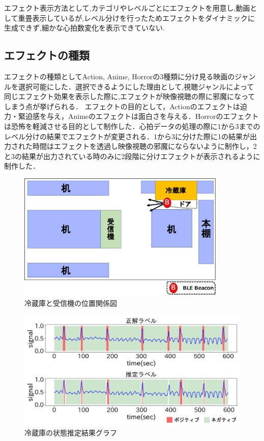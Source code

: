 エフェクト表示方法として,カテゴリやレベルごとにエフェクトを用意し,動画として重畳表示しているが,レベル分けを行ったためエフェクトをダイナミックに生成できず,細かな心拍数変化を表示できていない.


\subsection{エフェクトの種類}

エフェクトの種類としてAction, Anime, Horrorの3種類に分け見る映画のジャンルを選択可能にした．選択できるようにした理由として,視聴ジャンルによって同じエフェクト効果を表示した際に,エフェクトが映像視聴の際に邪魔になってしまう点が挙げられる．
エフェクトの目的として，Actionのエフェクトは迫力・緊迫感を与え，Animeのエフェクトは面白さを与える．Horrorのエフェクトは恐怖を軽減させる目的として制作した．心拍データの処理の際に1から3までのレベル分けの結果でエフェクトが変更される．1から3に分けた際に1の結果が出力された時間はエフェクトを透過し映像視聴の邪魔にならないように制作し，2と3の結果が出力されている時のみに2段階に分けエフェクトが表示されるように制作した．



\begin{figure}[tbh]
    \centering
    \includegraphics[width=10cm]{images/chapter3/refrigerator_position.pdf}
    \caption{冷蔵庫と受信機の位置関係図}
    \label{refrigerator_position}
\end{figure}


\begin{figure}[tbh]
    \centering
    \includegraphics[width=14cm]{images/chapter3/refrigerator_graph.jpg}
    \caption{冷蔵庫の状態推定結果グラフ}
    \label{refrigerator_graph}
\end{figure}


